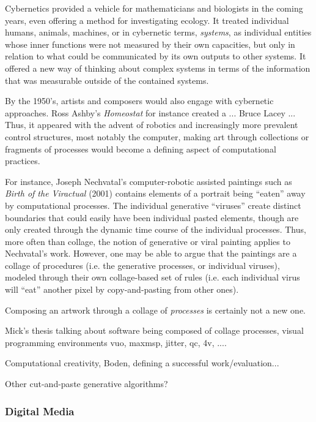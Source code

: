 \documentclass[a4paper,10pt,final]{ThesisStyle}
\begin{document}
Cybernetics provided a vehicle for mathematicians and biologists in the coming years, even offering a method for investigating ecology.  It treated individual humans, animals, machines, or in cybernetic terms, \textit{systems}, as individual entities whose inner functions were not measured by their own capacities, but only in relation to what could be communicated by its own outputs to other systems.  It offered a new way of thinking about complex systems in terms of the information that was measurable outside of the contained systems.  

By the 1950's, artists and composers would also engage with cybernetic approaches.  Ross Ashby's \textit{Homeostat} for instance created a ... Bruce Lacey ... Thus, it appeared with the advent of robotics and increasingly more prevalent control structures, most notably the computer, making art through collections or fragments of processes would become a defining aspect of computational practices.

For instance, Joseph Nechvatal's computer-robotic assisted paintings such as \textit{Birth of the Viractual} (2001) contains elements of a portrait being ``eaten'' away by computational processes.  The individual generative ``viruses'' create distinct boundaries that could easily have been individual pasted elements, though are only created through the dynamic time course of the individual processes.  Thus, more often than collage, the notion of generative or viral painting applies to Nechvatal's work.  However, one may be able to argue that the paintings are a collage of procedures (i.e. the generative processes, or individual viruses), modeled through their own collage-based set of rules (i.e. each individual virus will ``eat'' another pixel by copy-and-pasting from other ones).  

Composing an artwork through a collage of \textit{processes} is certainly not a new one.  

Mick's thesis talking about software being composed of collage processes, visual programming environments vuo, maxmsp, jitter, qc, 4v, ....

Computational creativity, Boden, defining a successful work/evaluation... 

Other cut-and-paste generative algorithms?

\subsubsection{Digital Media}
\end{document}
